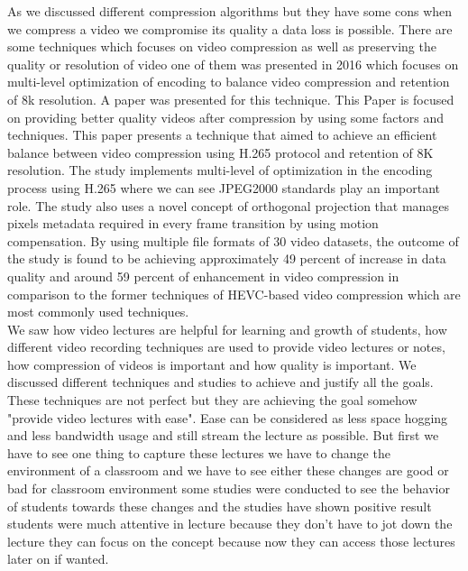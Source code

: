 As we discussed different compression algorithms but they have some cons when we compress a video we compromise its quality a data loss is possible. There are some techniques which focuses on video compression as well as preserving the quality or resolution of video one of them was presented in 2016 which focuses on multi-level optimization of encoding to balance video compression and retention of 8k resolution. A paper was presented for this technique. This Paper is focused on providing better quality videos after compression by using some factors and techniques. This paper presents a technique that aimed to achieve an efficient balance between video compression using H.265 protocol and retention of 8K resolution. The study implements multi-level of optimization in the encoding process using H.265 where we can see JPEG2000 standards play an important role. The study also uses a novel concept of orthogonal projection that manages pixels metadata required in every frame transition by using motion compensation. By using multiple file formats of 30 video datasets, the outcome of the study is found to be achieving approximately 49 percent of increase in data quality and around 59 percent of enhancement in video compression in comparison to the former techniques of HEVC-based video compression which are most commonly used techniques.\cite{Murthy2016}\\
We saw how video lectures are helpful for learning and growth of students, how different video recording techniques are used to provide video lectures or notes, how compression of videos is important and how quality is important. We discussed different techniques and studies to achieve and justify all the goals. These techniques are not perfect but they are achieving the goal somehow "provide video lectures with ease". Ease can be considered as less space hogging and less bandwidth usage and still stream the lecture as possible. But first we have to see one thing to capture these lectures we have to change the environment of a classroom and we have to see either these changes are good or bad for classroom environment some studies were conducted to see the behavior of students towards these changes and the studies have shown positive result students were much attentive in lecture because they don't have to jot down the lecture they can focus on the concept because now they can access those lectures later on if wanted.\cite{Brooks2014}\cite{Chen2015}\cite{Barokas2010}\\
